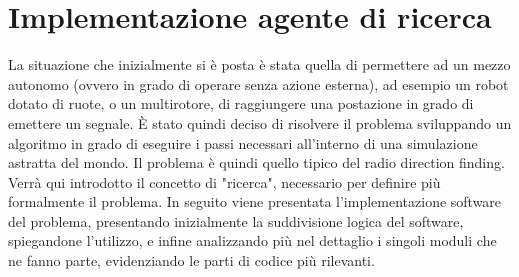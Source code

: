 \chapter{Implementazione agente di ricerca}
La situazione che inizialmente si è posta è stata quella di permettere ad un mezzo autonomo (ovvero in grado di operare senza azione esterna), ad esempio un robot dotato di ruote, o un multirotore, di raggiungere una postazione in grado di emettere un segnale. È stato quindi deciso di risolvere il problema sviluppando un algoritmo in grado di eseguire i passi necessari all'interno di una simulazione astratta del mondo. Il problema è quindi quello tipico del radio direction finding. Verrà qui introdotto il concetto di "ricerca", necessario per definire più formalmente il problema. In seguito viene presentata l'implementazione software del problema, presentando inizialmente la suddivisione logica del software, spiegandone l'utilizzo, e infine analizzando più nel dettaglio i singoli moduli che ne fanno parte, evidenziando le parti di codice più rilevanti.

